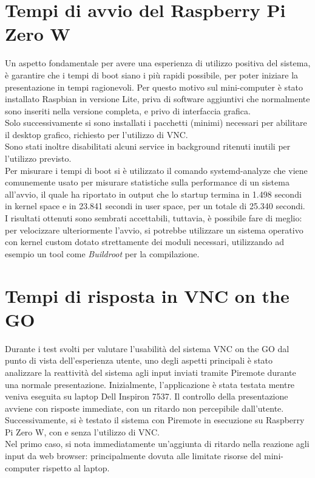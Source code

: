 \section{Tempi di avvio del Raspberry Pi Zero W}
Un aspetto fondamentale per avere una esperienza di utilizzo positiva del sistema, è garantire che i tempi di boot siano i più rapidi possibile, per poter iniziare la presentazione in tempi ragionevoli.
Per questo motivo sul mini-computer è stato installato Raspbian in versione Lite, priva di software aggiuntivi che normalmente sono inseriti nella versione completa, e privo di interfaccia grafica. \\Solo successivamente si sono installati i pacchetti (minimi) necessari per abilitare il desktop grafico, richiesto per l'utilizzo di VNC.\\
Sono stati inoltre disabilitati alcuni service in background ritenuti inutili per l'utilizzo previsto.\\
Per misurare i tempi di boot si è utilizzato il comando systemd-analyze che viene comunemente usato per misurare statistiche sulla performance di un sistema all'avvio, il quale ha riportato in output che lo startup termina in 1.498 secondi in kernel space e in 23.841 secondi in user space, per un totale di 25.340 secondi.\\


I risultati ottenuti sono sembrati accettabili, tuttavia, è possibile fare di meglio: per velocizzare ulteriormente l'avvio, si potrebbe utilizzare un sistema operativo con kernel custom dotato strettamente dei moduli necessari, utilizzando ad esempio un tool come \textit{Buildroot} per la compilazione. \\


\section{Tempi di risposta in VNC on the GO}
Durante i test svolti per valutare l'usabilità del sistema VNC on the GO dal punto di vista dell'esperienza utente, uno degli aspetti principali è stato analizzare la reattività del sistema agli input inviati tramite Piremote durante una normale presentazione.
Inizialmente, l'applicazione è stata testata mentre veniva eseguita su laptop Dell Inspiron 7537. Il controllo della presentazione avviene con risposte immediate, con un ritardo non percepibile dall'utente.\\
Successivamente, si è testato il sistema con Piremote in esecuzione su Raspberry Pi Zero W, con e senza l'utilizzo di VNC.\\
Nel primo caso, si nota immediatamente un'aggiunta di ritardo nella reazione agli input da web browser: principalmente dovuta alle limitate risorse del mini-computer rispetto al laptop.

